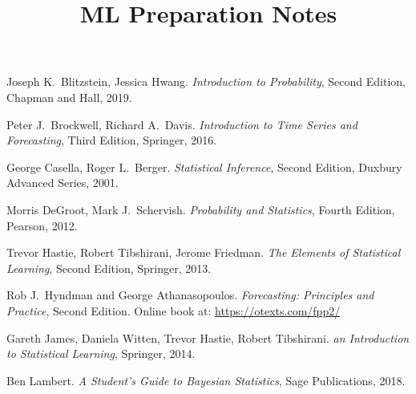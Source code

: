 \documentclass[11pt,a4]{report}
\title{ML Preparation Notes}
\theoremstyle{definition}
\begin{document}
\maketitle





\begin{thebibliography}{99}
  Joseph K.~Blitzstein, Jessica Hwang. \emph{Introduction 
to Probability}, Second Edition, Chapman and Hall, 2019.

 Peter J.~Brockwell, Richard A.~Davis. 
\emph{Introduction to Time Series and Forecasting}, Third Edition, Springer, 
2016. 

 George Casella, Roger L.~Berger. \emph{Statistical Inference}, 
Second Edition, Duxbury Advanced Series, 2001.

 Morris DeGroot, Mark J.~Schervish. \emph{Probability and 
Statistics}, Fourth Edition, Pearson, 2012.

 Trevor Hastie, Robert Tibshirani, Jerome Friedman. \emph{The 
Elements of Statistical Learning}, Second Edition, Springer, 2013.

 Rob J.~Hyndman and George Athanasopoulos. \emph{Forecasting: 
Principles and Practice}, Second Edition. Online book at: 
\url{https://otexts.com/fpp2/}

 Gareth James, Daniela Witten, Trevor Hastie, Robert Tibshirani. 
\emph{an Introduction to Statistical Learning}, Springer, 2014.

 Ben Lambert. \emph{A Student's Guide to Bayesian Statistics}, 
Sage Publications, 2018. 

\end{thebibliography}
\end{document}
